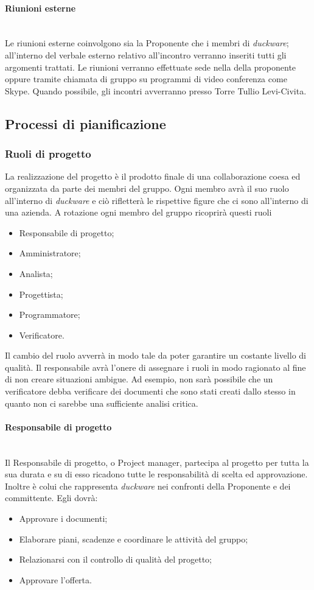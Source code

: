 \paragraph{Riunioni esterne}\mbox{}\\[0.4cm]
Le riunioni esterne coinvolgono sia la Proponente che i membri di \emph{duckware}; all’interno del verbale esterno relativo all’incontro verranno inseriti tutti gli argomenti trattati. Le riunioni verranno effettuate sede nella della proponente oppure tramite chiamata di gruppo su programmi di video conferenza come Skype. Quando possibile, gli incontri avverranno presso Torre Tullio Levi-Civita.

\subsection{Processi di pianificazione}
\label{sec:processi_pianificazione}
\subsubsection{Ruoli di progetto}
La realizzazione del progetto è il prodotto finale di una collaborazione coesa ed organizzata da parte dei membri del gruppo. Ogni membro avrà il suo ruolo all’interno di \emph{duckware} e ciò rifletterà le rispettive figure che ci sono all’interno di una azienda. A rotazione ogni membro del gruppo ricoprirà questi ruoli
\begin{itemize}
    \item Responsabile di progetto;
    \item Amministratore;
    \item Analista;
    \item Progettista;
    \item Programmatore;
    \item Verificatore.
\end{itemize}
Il cambio del ruolo avverrà in modo tale da poter garantire un costante livello di qualità. Il responsabile avrà l’onere di assegnare i ruoli in modo ragionato al fine di non creare situazioni ambigue. Ad esempio, non sarà possibile che un verificatore debba verificare dei documenti che sono stati creati dallo stesso in quanto non ci sarebbe una sufficiente analisi critica.
\paragraph{Responsabile di progetto}\mbox{}\\[0.4cm]
Il Responsabile di progetto, o Project manager, partecipa al progetto per tutta la sua durata e su di esso ricadono tutte le responsabilità di scelta ed approvazione. Inoltre è colui che rappresenta \emph{duckware} nei confronti della Proponente e dei committente. Egli dovrà:
\begin{itemize}
    \item Approvare i documenti;
    \item Elaborare piani, scadenze e coordinare le attività del gruppo;
    \item Relazionarsi con il controllo di qualità del progetto;
    \item Approvare l’offerta.
\end{itemize}

